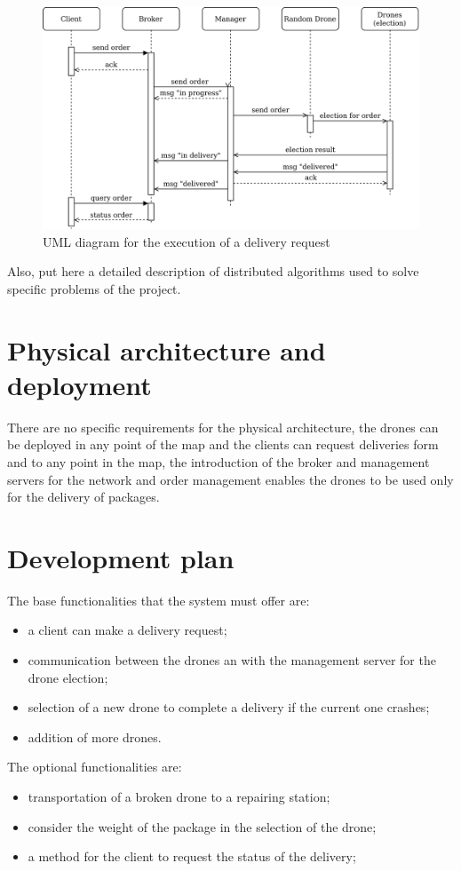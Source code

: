 \documentclass[a4paper, oneside]{memoir}
\begin{document}
\begin{figure}[h!]
	\centering
	\includegraphics[width=\linewidth]{New-order}
	\caption{UML diagram for the execution of a delivery request}
\end{figure}

Also, put here a detailed description of distributed algorithms used to solve specific problems of the project.

\section{Physical architecture and deployment}
 There are no specific requirements for the physical architecture, the drones can be deployed in any point of the map and the clients can request deliveries form and to any point in the map, the introduction of the broker and management servers for the network and order management enables the drones to be used only for the delivery of packages.


\section{Development plan}
The base functionalities that the system must offer are:
\begin{itemize}
\item a client can make a delivery request;
\item communication between the drones an with the management server for the drone election;
\item selection of a new drone to complete a delivery if the current one crashes;
\item addition of more drones.
\end{itemize}
The optional functionalities are:
\begin{itemize}
\item transportation of a broken drone to a repairing station;
\item consider the weight of the package in the selection of the drone;
\item a method for the client to request the status of the delivery;
\end{itemize}
\end{document}
